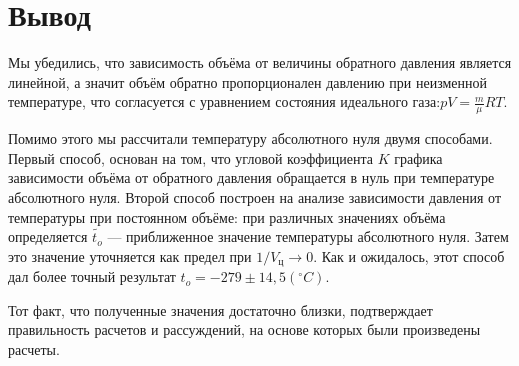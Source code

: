 \documentclass[12pt]{article}
\begin{document}
\section*{Вывод}
Мы убедились, что зависимость объёма от величины обратного давления является линейной, а значит объём обратно пропорционален давлению при неизменной температуре, что согласуется с уравнением состояния идеального газа:$pV = \frac{m}{\mu}RT$.

Помимо этого мы рассчитали температуру абсолютного нуля двумя способами. Первый способ, основан на том, что угловой коэффициента $K$ графика зависимости объёма от обратного давления обращается в нуль при температуре абсолютного нуля. Второй способ построен на анализе зависимости давления от температуры при постоянном объёме: при различных значениях объёма определяется $\widetilde{t_{o}}$ --- приближенное значение температуры абсолютного нуля. 
Затем это значение уточняется как предел   при $1/V_{ц} \to 0$. Как и ожидалось, этот способ дал более точный результат $ t_{o}=-279\pm14,5(^{\circ}C)$.

Тот факт, что полученные значения достаточно близки, подтверждает правильность расчетов и рассуждений, на основе которых были произведены расчеты. 
\end{document}
